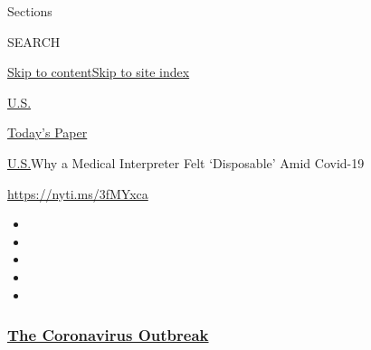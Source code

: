 Sections

SEARCH

\protect\hyperlink{site-content}{Skip to
content}\protect\hyperlink{site-index}{Skip to site index}

\href{https://www.nytimes3xbfgragh.onion/section/us}{U.S.}

\href{https://myaccount.nytimes3xbfgragh.onion/auth/login?response_type=cookie\&client_id=vi}{}

\href{https://www.nytimes3xbfgragh.onion/section/todayspaper}{Today's
Paper}

\href{/section/us}{U.S.}\textbar{}Why a Medical Interpreter Felt
`Disposable' Amid Covid-19

\url{https://nyti.ms/3fMYxca}

\begin{itemize}
\item
\item
\item
\item
\item
\end{itemize}

\hypertarget{the-coronavirus-outbreak}{%
\subsubsection{\texorpdfstring{\href{https://www.nytimes3xbfgragh.onion/news-event/coronavirus?name=styln-coronavirus-national\&region=TOP_BANNER\&block=storyline_menu_recirc\&action=click\&pgtype=Article\&impression_id=6b8ad080-f2c5-11ea-bc20-931b35b979be\&variant=undefined}{The
Coronavirus
Outbreak}}{The Coronavirus Outbreak}}\label{the-coronavirus-outbreak}}


